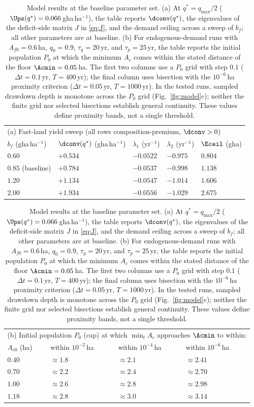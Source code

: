 \begin{table}[!htbp]
\centering\small
\caption{Model results at the baseline parameter set. (a) At $q^*=q_{\max}/2$ ($\Ups(q^*)=0.066$\,gha\,ha$^{-1}$), the table reports $\dconv(q^*)$, the eigenvalues of the deficit-side matrix $J$ in \eqref{eq:J}, and the demand ceiling across a sweep of $b_f$; all other parameters are at baseline. (b) For endogenous-demand runs with $A_{f0}=0.6$\,ha, $q_0=0.9$, $\tau_g=20$\,yr, and $\tau_p=25$\,yr, the table reports the initial population $P_0$ at which the minimum $A_c$ comes within the stated distance of the floor $\Acmin=0.05$\,ha. The first two columns use a $P_0$ grid with step $0.1$ ($\Delta t=0.1$\,yr, $T=400$\,yr); the final column uses bisection with the $10^{-6}$\,ha proximity criterion ($\Delta t=0.05$\,yr, $T=1000$\,yr). In the tested runs, sampled drawdown depth is monotone across the $P_0$ grid (Fig.~\ref{fig:model}c); neither the finite grid nor selected bisections establish general continuity. These values define proximity bands, not a single threshold.}
\label{tab:model}
\begin{tabular}{l l l l l}
\toprule
\multicolumn{5}{l}{(a) Fast-land yield sweep (all rows composition-premium, $\dconv>0$)}\\
$b_f$ (gha\,ha$^{-1}$) & $\dconv(q^*)$ (gha\,ha$^{-1}$) & $\lambda_1$ (yr$^{-1}$) & $\lambda_2$ (yr$^{-1}$) & $\Eceil$ (gha) \\
\midrule
$0.60$ & $+0.534$ & $-0.0522$ & $-0.975$ & $0.804$ \\
$0.85$ (baseline) & $+0.784$ & $-0.0537$ & $-0.998$ & $1.138$ \\
$1.20$ & $+1.134$ & $-0.0547$ & $-1.014$ & $1.606$ \\
$2.00$ & $+1.934$ & $-0.0556$ & $-1.029$ & $2.675$ \\
\bottomrule
\end{tabular}

\medskip
\begin{tabular}{l l l l}
\toprule
\multicolumn{4}{l}{(b) Initial population $P_0$ (cap) at which $\min_tA_c$ approaches $\Acmin$ to within:}\\ 
$A_{c0}$ (ha) & within $10^{-2}$\,ha & within $10^{-4}$\,ha & within $10^{-6}$\,ha \\
\midrule
$0.40$ & $\approx1.8$ & $\approx2.1$ & $\approx2.41$ \\
$0.70$ & $\approx2.2$ & $\approx2.4$ & $\approx2.70$ \\
$1.00$ & $\approx2.6$ & $\approx2.8$ & $\approx2.98$ \\
$1.18$ & $\approx2.8$ & $\approx3.0$ & $\approx3.14$ \\
\bottomrule
\end{tabular}
\end{table}

